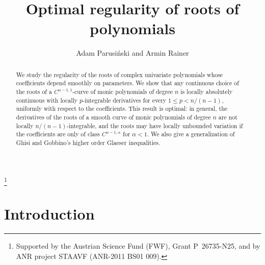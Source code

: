 \documentclass[12pt]{amsart}
\title[Optimal regularity of roots of polynomials]
{Optimal regularity of roots of polynomials}
\author[Adam Parusi\'nski and  Armin Rainer]
{Adam Parusi\'nski and Armin Rainer}
\theoremstyle{plain}
\theoremstyle{definition}
\numberwithin{equation}{section}
\begin{document}
\begin{abstract}
  We study the regularity of the roots of complex univariate polynomials 
  whose coefficients depend smoothly on parameters. We show that any 
  continuous choice of the roots of a $C^{n-1,1}$-curve of monic polynomials 
  of degree $n$ is locally absolutely continuous with locally $p$-integrable 
  derivatives for every $1 \le p < n/(n-1)$, uniformly with respect to the coefficients. 
  This result is optimal: in general, the derivatives of the roots of a smooth 
  curve of monic polynomials of degree $n$ are not locally $n/(n-1)$-integrable, 
  and the roots may have locally unbounded variation if the coefficients are only 
  of class $C^{n-1,\alpha}$ for $\alpha <1$. 
  We also give a generalization of Ghisi and Gobbino's higher order Glaeser inequalities.
\end{abstract}

\thanks{Supported by the Austrian Science Fund (FWF), Grant P~26735-N25, and by ANR project STAAVF (ANR-2011 BS01 009).}
 
\maketitle

\section{Introduction}
\end{document}
